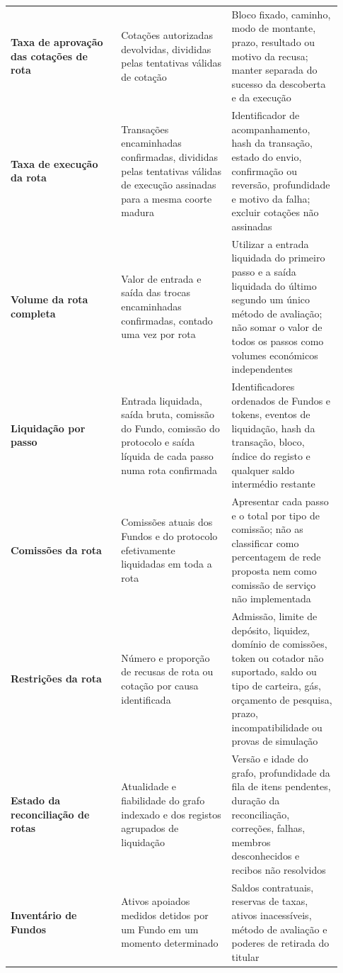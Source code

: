 \documentclass[11pt]{article}
\begin{document}
\begin{longtable}{P{0.31\linewidth} P{0.31\linewidth} P{0.31\linewidth}}
\textbf{Taxa de aprovação das cotações de rota} & Cotações autorizadas devolvidas, divididas pelas tentativas válidas de cotação & Bloco fixado, caminho, modo de montante, prazo, resultado ou motivo da recusa; manter separada do sucesso da descoberta e da execução \\
\textbf{Taxa de execução da rota} & Transações encaminhadas confirmadas, divididas pelas tentativas válidas de execução assinadas para a mesma coorte madura & Identificador de acompanhamento, hash da transação, estado do envio, confirmação ou reversão, profundidade e motivo da falha; excluir cotações não assinadas \\
\textbf{Volume da rota completa} & Valor de entrada e saída das trocas encaminhadas confirmadas, contado uma vez por rota & Utilizar a entrada liquidada do primeiro passo e a saída liquidada do último segundo um único método de avaliação; não somar o valor de todos os passos como volumes económicos independentes \\
\textbf{Liquidação por passo} & Entrada liquidada, saída bruta, comissão do Fundo, comissão do protocolo e saída líquida de cada passo numa rota confirmada & Identificadores ordenados de Fundos e tokens, eventos de liquidação, hash da transação, bloco, índice do registo e qualquer saldo intermédio restante \\
\textbf{Comissões da rota} & Comissões atuais dos Fundos e do protocolo efetivamente liquidadas em toda a rota & Apresentar cada passo e o total por tipo de comissão; não as classificar como percentagem de rede proposta nem como comissão de serviço não implementada \\
\textbf{Restrições da rota} & Número e proporção de recusas de rota ou cotação por causa identificada & Admissão, limite de depósito, liquidez, domínio de comissões, token ou cotador não suportado, saldo ou tipo de carteira, gás, orçamento de pesquisa, prazo, incompatibilidade ou provas de simulação \\
\textbf{Estado da reconciliação de rotas} & Atualidade e fiabilidade do grafo indexado e dos registos agrupados de liquidação & Versão e idade do grafo, profundidade da fila de itens pendentes, duração da reconciliação, correções, falhas, membros desconhecidos e recibos não resolvidos \\
\textbf{Inventário de Fundos} & Ativos apoiados medidos detidos por um Fundo em um momento determinado & Saldos contratuais, reservas de taxas, ativos inacessíveis, método de avaliação e poderes de retirada do titular \\

\end{longtable}
\end{document}
